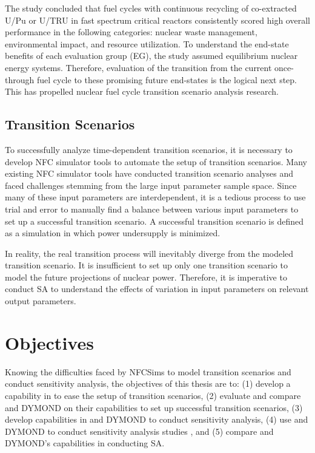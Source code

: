 The study concluded that fuel cycles with continuous recycling
of co-extracted U/Pu or U/TRU in fast spectrum critical reactors
consistently scored high overall performance in the following 
categories: nuclear waste management, environmental impact, 
and resource utilization. 
To understand the end-state benefits of each evaluation group (EG), 
the study assumed equilibrium nuclear energy systems. 
Therefore, evaluation of the transition from the current 
once-through fuel cycle to these promising 
future end-states \cite{feng_standardized_2016} 
is the logical next step. 
This has propelled nuclear fuel cycle transition 
scenario analysis research. 

\subsection{Transition Scenarios}
To successfully analyze time-dependent transition
scenarios, it is necessary to develop \gls{NFC} simulator tools to  
automate the setup of transition scenarios. 
Many existing \gls{NFC} simulator tools have conducted 
transition scenario analyses \cite{feng_standardized_2016,bae_standardized_2019,coquelet-pascal_cosi6:_2015}
and faced challenges stemming from the large input parameter
sample space.
Since many of these input parameters are interdependent, it is 
a tedious process to use trial and error to manually find a balance 
between various input parameters to set up a successful transition 
scenario. 
A successful transition scenario is defined as a simulation in which 
power undersupply is minimized. 
 
In reality, the real transition process will 
inevitably diverge from the modeled transition scenario. 
It is insufficient to set up only one transition scenario to model 
the future projections of nuclear power.
Therefore, it is imperative to conduct \gls{SA} to understand 
the effects of variation in input parameters on 
relevant output parameters. 

\section{Objectives}
Knowing the difficulties faced by \glspl{NFCSim} to model 
transition scenarios and conduct sensitivity analysis, 
the objectives of this thesis are to: 
(1) develop a capability in \Cyclus to ease the setup of 
transition scenarios, 
(2) evaluate and compare \Cyclus and 
DYMOND on their capabilities to set up 
successful transition scenarios,
(3) develop capabilities in \Cyclus and DYMOND to conduct 
sensitivity analysis,
(4) use \Cyclus and DYMOND to conduct sensitivity analysis studies
, and
(5) compare \Cyclus and DYMOND's capabilities in conducting \gls{SA}. 
